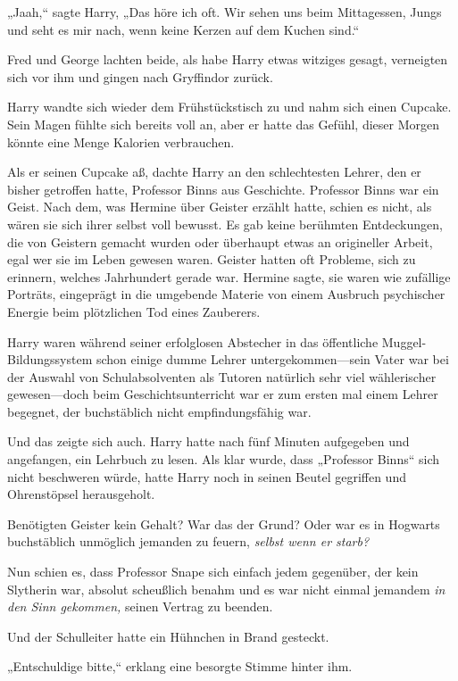 {„Jaah,“ sagte Harry, „Das höre ich oft. Wir sehen uns beim Mittagessen, Jungs und seht es mir nach, wenn keine Kerzen auf dem Kuchen sind.“

Fred und George lachten beide, als habe Harry etwas witziges gesagt, verneigten sich vor ihm und gingen nach Gryffindor zurück.

Harry wandte sich wieder dem Frühstückstisch zu und nahm sich einen Cupcake. Sein Magen fühlte sich bereits voll an, aber er hatte das Gefühl, dieser Morgen könnte eine Menge Kalorien verbrauchen.

Als er seinen Cupcake aß, dachte Harry an den schlechtesten Lehrer, den er bisher getroffen hatte, Professor Binns aus Geschichte. Professor Binns war ein Geist. Nach dem, was Hermine über Geister erzählt hatte, schien es nicht, als wären sie sich ihrer selbst voll bewusst. Es gab keine berühmten Entdeckungen, die von Geistern gemacht wurden oder überhaupt etwas an origineller Arbeit, egal wer sie im Leben gewesen waren. Geister hatten oft Probleme, sich zu erinnern, welches Jahrhundert gerade war. Hermine sagte, sie waren wie zufällige Porträts, eingeprägt in die umgebende Materie von einem Ausbruch psychischer Energie beim plötzlichen Tod eines Zauberers.

Harry waren während seiner erfolglosen Abstecher in das öffentliche Muggel-Bildungssystem schon einige dumme Lehrer untergekommen—sein Vater war bei der Auswahl von Schulabsolventen als Tutoren natürlich sehr viel wählerischer gewesen—doch beim Geschichtsunterricht war er zum ersten mal einem Lehrer begegnet, der buchstäblich nicht empfindungsfähig war.

Und das zeigte sich auch. Harry hatte nach fünf Minuten aufgegeben und angefangen, ein Lehrbuch zu lesen. Als klar wurde, dass „Professor Binns“ sich nicht beschweren würde, hatte Harry noch in seinen Beutel gegriffen und Ohrenstöpsel herausgeholt.

Benötigten Geister kein Gehalt? War das der Grund? Oder war es in Hogwarts buchstäblich unmöglich jemanden zu feuern, \emph{selbst wenn er starb?}

Nun schien es, dass Professor Snape sich einfach jedem gegenüber, der kein Slytherin war, absolut scheußlich benahm und es war nicht einmal jemandem \emph{in den Sinn gekommen,} seinen Vertrag zu beenden.

Und der Schulleiter hatte ein Hühnchen in Brand gesteckt.

„Entschuldige bitte,“ erklang eine besorgte Stimme hinter ihm.

}
